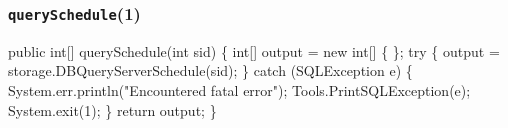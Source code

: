 \documentclass{article}
\def\nwendcode{\endtrivlist \endgroup}      %
\let\nwdocspar=\par
\begin{document}
\subsubsection{{\tt{}\protect{}querySchedule}(1)}
\nwenddocs{}\endmoddef{}
public int[] querySchedule(int sid) \{
  int[] output = new int[] \{ \};
  try \{
    output = storage.DBQueryServerSchedule(sid);
  \} catch (SQLException e) \{
    System.err.println("Encountered fatal error");
    Tools.PrintSQLException(e);
    System.exit(1);
  \}
  return output;
\}
\eatline
{}\nwendcode{}\nwdocspar
\end{document}
